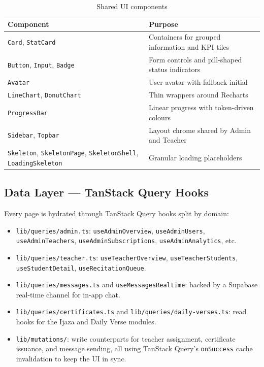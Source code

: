 \begin{table}[H]
  \centering
  \caption{Shared UI components}
  \label{tab:impl_dash_components}
  \renewcommand{\arraystretch}{1.3}
  \begin{tabular}{lp{8.5cm}}
    \toprule
    \textbf{Component} & \textbf{Purpose} \\
    \midrule
    \texttt{Card}, \texttt{StatCard}     & Containers for grouped information and KPI tiles \\
    \texttt{Button}, \texttt{Input}, \texttt{Badge} & Form controls and pill-shaped status indicators \\
    \texttt{Avatar}                       & User avatar with fallback initial \\
    \texttt{LineChart}, \texttt{DonutChart} & Thin wrappers around Recharts \\
    \texttt{ProgressBar}                  & Linear progress with token-driven colours \\
    \texttt{Sidebar}, \texttt{Topbar}     & Layout chrome shared by Admin and Teacher \\
    \texttt{Skeleton}, \texttt{SkeletonPage}, \texttt{SkeletonShell}, \texttt{LoadingSkeleton} & Granular loading placeholders \\
    \bottomrule
  \end{tabular}
\end{table}

\subsection{Data Layer --- TanStack Query Hooks}

Every page is hydrated through TanStack Query hooks split by domain:

\begin{itemize}[leftmargin=2em]
  \item \texttt{lib/queries/admin.ts}: \texttt{useAdminOverview}, \texttt{useAdminUsers}, \texttt{useAdminTeachers}, \texttt{useAdminSubscriptions}, \texttt{useAdminAnalytics}, etc.
  \item \texttt{lib/queries/teacher.ts}: \texttt{useTeacherOverview}, \texttt{useTeacherStudents}, \texttt{useStudentDetail}, \texttt{useRecitationQueue}.
  \item \texttt{lib/queries/messages.ts} and \texttt{useMessagesRealtime}: backed by a Supabase real-time channel for in-app chat.
  \item \texttt{lib/queries/certificates.ts} and \texttt{lib/queries/daily-verses.ts}: read hooks for the Ijaza and Daily Verse modules.
  \item \texttt{lib/mutations/}: write counterparts for teacher assignment, certificate issuance, and message sending, all using TanStack Query's \texttt{onSuccess} cache invalidation to keep the UI in sync.
\end{itemize}

